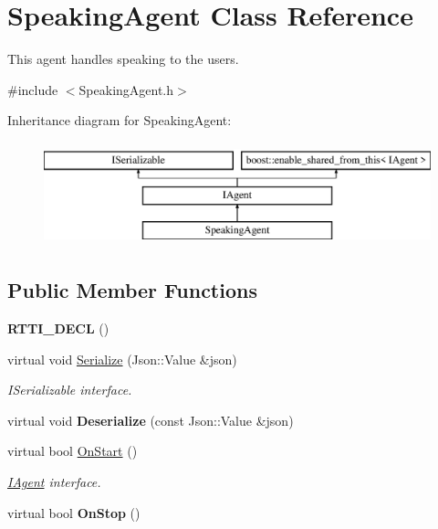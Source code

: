 \hypertarget{class_speaking_agent}{}\section{Speaking\+Agent Class Reference}
\label{class_speaking_agent}


This agent handles speaking to the users.  




{\ttfamily \#include $<$Speaking\+Agent.\+h$>$}

Inheritance diagram for Speaking\+Agent\+:\begin{figure}[H]
\begin{center}
\leavevmode
\includegraphics[height=3.000000cm]{class_speaking_agent}
\end{center}
\end{figure}
\subsection*{Public Member Functions}
\begin{DoxyCompactItemize}
\item 
\mbox{\label{class_speaking_agent_ab76cc72819c1cf1409baf476b1f647a3}} 
{\bfseries R\+T\+T\+I\+\_\+\+D\+E\+CL} ()
\item 
\mbox{\label{class_speaking_agent_a96b26b83fec70919db5b664ab46b72fc}} 
virtual void \hyperlink{class_speaking_agent_a96b26b83fec70919db5b664ab46b72fc}{Serialize} (Json\+::\+Value \&json)
\begin{DoxyCompactList}\small\item\em I\+Serializable interface. \end{DoxyCompactList}\item 
\mbox{\label{class_speaking_agent_a18dcd616935e2a919f86ab31eb37c025}} 
virtual void {\bfseries Deserialize} (const Json\+::\+Value \&json)
\item 
\mbox{\label{class_speaking_agent_a23e80cebae63290603ea31ba14c3343e}} 
virtual bool \hyperlink{class_speaking_agent_a23e80cebae63290603ea31ba14c3343e}{On\+Start} ()
\begin{DoxyCompactList}\small\item\em \hyperlink{class_i_agent}{I\+Agent} interface. \end{DoxyCompactList}\item 
\mbox{\label{class_speaking_agent_a1cbb931dd1aa6fd70a3339c142c8b97d}} 
virtual bool {\bfseries On\+Stop} ()
\end{DoxyCompactItemize}
